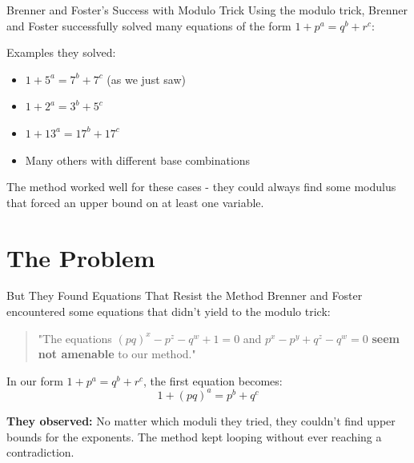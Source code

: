 ﻿\documentclass[10pt,aspectratio=169]{beamer}
\begin{document}
\begin{frame}{Brenner and Foster's Success with Modulo Trick}
    Using the modulo trick, Brenner and Foster successfully solved many equations of the form $1+p^a = q^b + r^c$:
    
    \vspace{0.3cm}
    Examples they solved:
    \begin{itemize}
        \item $1+5^a = 7^b + 7^c$ (as we just saw)
        \item $1+2^a = 3^b + 5^c$
        \item $1+13^a = 17^b + 17^c$
        \item Many others with different base combinations
    \end{itemize}
    
    \vspace{0.3cm}
    The method worked well for these cases - they could always find some modulus that forced an upper bound on at least one variable.
\end{frame}

\section{The Problem}

\begin{frame}{But They Found Equations That Resist the Method}
    Brenner and Foster encountered some equations that didn't yield to the modulo trick:
    
    \begin{quote}
        "The equations $(pq)^x - p^z - q^w + 1 = 0$ and $p^x - p^y + q^z - q^w = 0$ \textbf{seem not amenable} to our method."
    \end{quote}
    
    \vspace{0.3cm}
    In our form $1+p^a = q^b + r^c$, the first equation becomes:
    \[1 + (pq)^a = p^b + q^c\]
    
    \vspace{0.2cm}
    \textbf{They observed:} No matter which moduli they tried, they couldn't find upper bounds for the exponents. The method kept looping without ever reaching a contradiction.
\end{frame}
\end{document}
